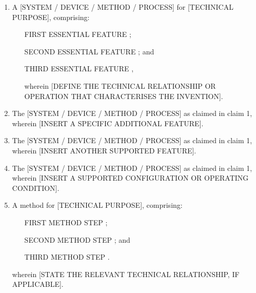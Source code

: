 \documentclass[12pt,a4paper]{article}
\begin{document}
\begin{enumerate}[label=\arabic*.]
    \item A [SYSTEM / DEVICE / METHOD / PROCESS] for
    [TECHNICAL PURPOSE], comprising:

    \begin{enumerate}[label=(\alph*)]
        \item [FIRST ESSENTIAL FEATURE];
        \item [SECOND ESSENTIAL FEATURE]; and
        \item [THIRD ESSENTIAL FEATURE],

        wherein [DEFINE THE TECHNICAL RELATIONSHIP OR
        OPERATION THAT CHARACTERISES THE INVENTION].
    \end{enumerate}

    \item The [SYSTEM / DEVICE / METHOD / PROCESS] as
    claimed in claim 1, wherein [INSERT A SPECIFIC
    ADDITIONAL FEATURE].

    \item The [SYSTEM / DEVICE / METHOD / PROCESS] as
    claimed in claim 1, wherein [INSERT ANOTHER
    SUPPORTED FEATURE].

    \item The [SYSTEM / DEVICE / METHOD / PROCESS] as
    claimed in claim 1, wherein [INSERT A SUPPORTED
    CONFIGURATION OR OPERATING CONDITION].

    \item A method for [TECHNICAL PURPOSE], comprising:

    \begin{enumerate}[label=(\alph*)]
        \item [FIRST METHOD STEP];
        \item [SECOND METHOD STEP]; and
        \item [THIRD METHOD STEP].
    \end{enumerate}

    wherein [STATE THE RELEVANT TECHNICAL RELATIONSHIP,
    IF APPLICABLE].
\end{enumerate}


\end{document}
